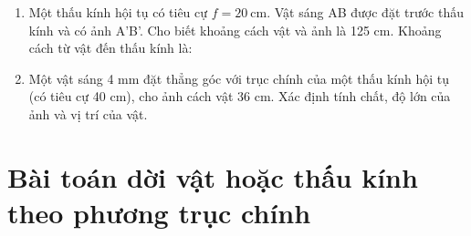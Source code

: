 \begin{enumerate}
	\item  Một thấu kính hội tụ có tiêu cự $f = 20\ \text{cm}$. Vật sáng AB được đặt trước thấu kính và có ảnh A'B'. Cho biết khoảng cách vật và ảnh là 125 cm. Khoảng cách từ vật đến thấu kính là:
	
	\item Một vật sáng 4 mm đặt thẳng góc với trục chính của một thấu kính hội tụ (có tiêu cự 40 cm), cho ảnh cách vật 36 cm. Xác định tính chất, độ lớn của ảnh và vị trí của vật.
	
	
\end{enumerate}
\section{Bài toán dời vật hoặc thấu kính theo phương trục chính}

